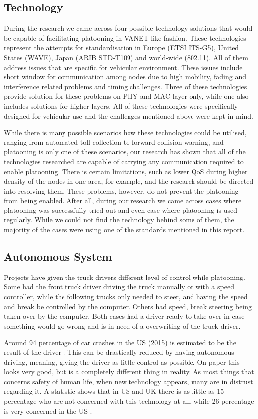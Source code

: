 \subsection{Technology}
% 
During the research we came across four possible technology solutions that would be capable of facilitating platooning in VANET-like fashion. These technologies represent the attempts for standardisation in Europe (ETSI ITS-G5), United States (WAVE), Japan (ARIB STD-T109) and world-wide (802.11). All of them address issues that are specific for vehicular environment. These issues include short window for communication among nodes due to high mobility, fading and interference related problems and timing challenges. Three of these technologies provide solution for these problems on PHY and MAC layer only, while one also includes solutions for higher layers. All of these technologies were specifically designed for vehicular use and the challenges mentioned above were kept in mind.\par
% 
While there is many possible scenarios how these technologies could be utilised, ranging from automated toll collection to forward collision warning, and platooning is only one of these scenarios, our research has shown that all of the technologies researched are capable of carrying any communication required to enable platooning. There is certain limitations, such as lower QoS during higher density of the nodes in one area, for example, and the research should be directed into resolving them. These problems, however, do not prevent the platooning from being enabled. After all, during our research we came across cases where platooning was successfully tried out and even case where platooning is used regularly. While we could not find the technology behind some of them, the majority of the cases were using one of the standards mentioned in this report.\par
% 
%
\subsection{Autonomous System}
Projects have given the truck drivers different level of control while platooning. Some had the front truck driver driving the truck manually or with a speed controller, while the following trucks only needed to steer, and having the speed and break be controlled by the computer. Others had speed, break steering being taken over by the computer. Both cases had a driver ready to take over in case something would go wrong and is in need of a overwriting of the truck driver.\par
% 
Around 94 percentage of car crashes in the US (2015) is estimated to be the result of the driver \cite{HighwayTrafficSafetyAdministration2015TRAFFICSurvey}.
This can be drastically reduced by having autonomous driving, meaning, giving the driver as little control as possible. On paper this looks very good, but is a completely different thing in reality. As most things that concerns safety of human life, when new technology appears, many are in distrust regarding it. A statistic shows that in US and UK there is as little as 15 percentage who are not concerned with this technology at all, while 26 percentage is very concerned in the US \cite{Schoettle2014AAustralia}. 
